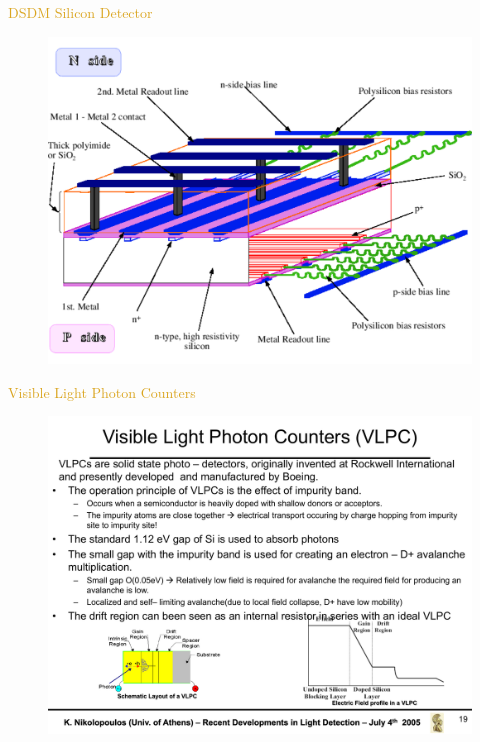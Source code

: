 \begin{frame}{\textcolor{Goldenrod}{DSDM Silicon Detector}}
  \begin{figure}[h]\centering
    \includegraphics[width=0.95\linewidth]{./Images/106_extra_DSDM.pdf}
  \end{figure}
\end{frame}


\begin{frame}{\textcolor{Goldenrod}{Visible Light Photon Counters}}
  \begin{figure}[h]\centering
    \includegraphics[width=0.95\linewidth]{./Images/107_extra_VLPCs}
  \end{figure}
\end{frame}


